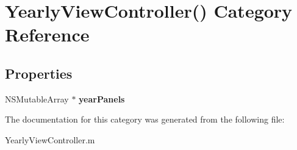\hypertarget{category_yearly_view_controller_07_08}{\section{Yearly\+View\+Controller() Category Reference}
\label{category_yearly_view_controller_07_08}
}
\subsection*{Properties}
\begin{DoxyCompactItemize}
\item 
\hypertarget{category_yearly_view_controller_07_08_a05576d69588318e09b7575aac0382f3a}{N\+S\+Mutable\+Array $\ast$ {\bfseries year\+Panels}}\label{category_yearly_view_controller_07_08_a05576d69588318e09b7575aac0382f3a}

\end{DoxyCompactItemize}


The documentation for this category was generated from the following file\+:\begin{DoxyCompactItemize}
\item 
Yearly\+View\+Controller.\+m\end{DoxyCompactItemize}
